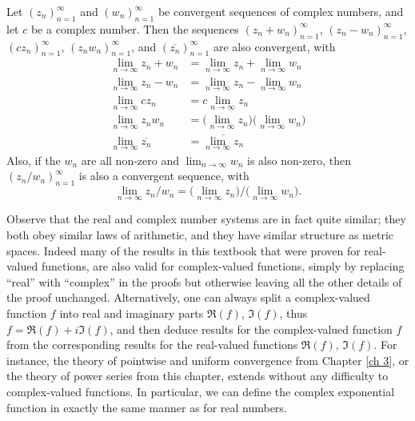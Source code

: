 \begin{lemma}\label{4.6.14}
    Let \((z_n)_{n = 1}^\infty\) and \((w_n)_{n = 1}^\infty\) be convergent sequences of complex numbers, and let \(c\) be a complex number.
    Then the sequences \((z_n + w_n)_{n = 1}^\infty\), \((z_n - w_n)_{n = 1}^\infty\), \((c z_n)_{n = 1}^\infty\), \((z_n w_n)_{n = 1}^\infty\), and \((\overline{z_n})_{n = 1}^\infty\) are also convergent, with
    \begin{align*}
        \lim_{n \to \infty} z_n + w_n      & = \lim_{n \to \infty} z_n + \lim_{n \to \infty} w_n                       \\
        \lim_{n \to \infty} z_n - w_n      & = \lim_{n \to \infty} z_n - \lim_{n \to \infty} w_n                       \\
        \lim_{n \to \infty} c z_n          & = c \lim_{n \to \infty} z_n                                               \\
        \lim_{n \to \infty} z_n w_n        & = \bigg(\lim_{n \to \infty} z_n\bigg) \bigg(\lim_{n \to \infty} w_n\bigg) \\
        \lim_{n \to \infty} \overline{z_n} & = \overline{\lim_{n \to \infty} z_n}
    \end{align*}
    Also, if the \(w_n\) are all non-zero and \(\lim_{n \to \infty} w_n\) is also non-zero, then \((z_n / w_n)_{n = 1}^\infty\) is also a convergent sequence, with
    \[
        \lim_{n \to \infty} z_n / w_n = \bigg(\lim_{n \to \infty} z_n\bigg) / \bigg(\lim_{n \to \infty} w_n\bigg).
    \]
\end{lemma}

\begin{note}
    Observe that the real and complex number systems are in fact quite similar;
    they both obey similar laws of arithmetic, and they have similar structure as metric spaces.
    Indeed many of the results in this textbook that were proven for real-valued functions, are also valid for complex-valued functions, simply by replacing ``real'' with ``complex'' in the proofs but otherwise leaving all the other details of the proof unchanged.
    Alternatively, one can always split a complex-valued function \(f\) into real and imaginary parts \(\Re(f)\), \(\Im(f)\), thus \(f = \Re(f) + i \Im(f)\), and then deduce results for the complex-valued function \(f\) from the corresponding results for the real-valued functions \(\Re(f)\), \(\Im(f)\).
    For instance, the theory of pointwise and uniform convergence from Chapter \ref{ch 3}, or the theory of power series from this chapter, extends without any difficulty to complex-valued functions.
    In particular, we can define the complex exponential function in exactly the same manner as for real numbers.
\end{note}

